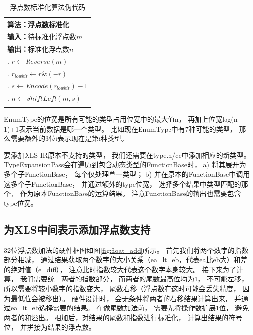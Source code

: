 \begin{table}
\begin{flushleft}
    \caption{浮点数标准化算法伪代码}
    \label{alg.normalize}
    \begin{tabular*}{\hsize}{@{}@{\extracolsep{\fill}}l@{}}
        \Xhline{3\arrayrulewidth}
        \;\textbf{算法：}浮点数标准化 \\
        \hline

        \;\textbf{输入：}$\text{待标准化浮点数}m$ \\
        \;\textbf{输出：}$\text{标准化浮点数}n$ \\
        \;1. $r \gets Reverse(m)$ \\
        \;2. $r_{lowbit} \gets r \& (-r)$ \\
        \;3. $s \gets Encode(r_{lowbit}) - 1$ \\
        \;4. $n \gets ShiftLeft(m, s)$ \\

        \Xhline{3\arrayrulewidth}
    \end{tabular*}
\end{flushleft}
\end{table}

EnumType的位宽是所有可能的类型占用位宽中的最大值n，
再加上位宽log(n-1)+1表示当前数据是哪一个类型。
比如现在EnumType中有7种可能的类型，
那么需要额外的3位i表示现在是第i种类型。

要添加XLS IR原本不支持的类型，
我们还需要在type.h/cc中添加相应的新类型。
TypeExpansionPass会在遍历到包含动态类型的FunctionBase时，
a) 将其展开为多个子FunctionBase，
每个仅处理单一类型；
b) 并在原本的FunctionBase中调用这多个子FunctionBase，
并通过额外的type位宽，
选择多个结果中类型匹配的那个，
作为原本FunctionBase的运算结果。
注意FunctionBase的输出也需要包含type位宽。


\subsection{为XLS中间表示添加浮点数支持}

32位浮点数加法的硬件框图如图\ref{fig:float_add}所示。
首先我们将两个数字的指数部分相减，
通过结果获取两个数字的大小关系（ea\_lt\_eb，代表ea比eb大）和差的绝对值（e\_diff），
注意此时指数较大代表这个数字本身较大。
接下来为了计算，
我们需要统一两者的指数部分，
而两者的尾数最高位均为1，
不可能左移，
所以需要将较小数字的指数变大，
尾数右移（浮点数在这时可能会丢失精度，
因为最低位会被移出）。
硬件设计时，
会无条件将两者的右移结果计算出来，
并通过ea\_lt\_eb选择需要的结果。
在做尾数加法前，
需要先将操作数扩展1位，
避免两者的和溢出。
相加后，对结果的尾数和指数进行标准化，
计算出结果的符号位，
并拼接为结果的浮点数。

